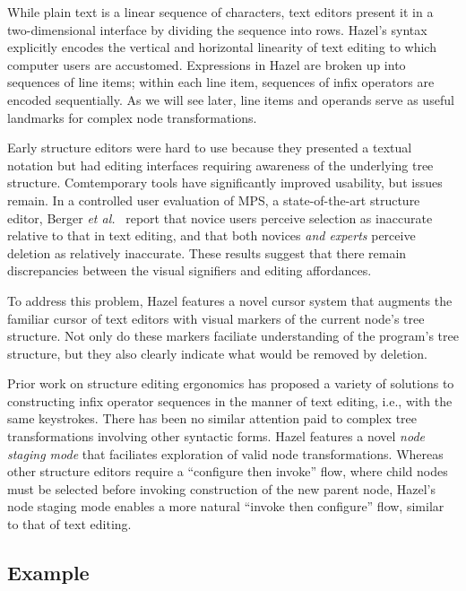 \documentclass[format=sigplan,dvipsnames,backend=bibtex]{acmart}
\newcommand{\Hazel}{\textsf{Hazel}\xspace}
\begin{document}
While plain text is a linear sequence of characters, text editors present it in a
	two-dimensional interface by dividing the sequence into rows.
\Hazel's syntax explicitly encodes the vertical and horizontal linearity of text
	editing to which computer users are accustomed.
Expressions in \Hazel are broken up into sequences of line items; 
	within each line item, sequences of infix operators are encoded sequentially.
As we will see later, line items and operands serve as useful landmarks for complex
	node transformations.

Early structure editors were hard to use because they presented a textual notation
	but had editing interfaces requiring awareness of the underlying tree structure.
Comtemporary tools have significantly improved usability, but issues remain.
In a controlled user evaluation of MPS, a state-of-the-art structure editor,
	Berger \emph{et al.}~ \cite{ProjEfficiency}
	report that novice users perceive selection as inaccurate relative to that in text
	editing, and that both novices \emph{and experts} perceive deletion as relatively inaccurate.
These results suggest that there remain discrepancies between the visual signifiers and
	editing affordances.

To address this problem, \Hazel features a novel cursor system that augments the familiar
	cursor of text editors with visual markers of the current node's tree structure.
Not only do these markers faciliate understanding of the program's tree structure,
	but they also clearly indicate what would be removed by deletion.

Prior work on structure editing ergonomics has proposed a variety of solutions to 
	constructing infix operator sequences in the manner of text editing, i.e., with the
	same keystrokes.
There has been no similar attention paid to complex tree transformations involving other 
	syntactic forms.
\Hazel features a novel \emph{node staging mode} that faciliates exploration of valid
	node transformations.
Whereas other structure editors require a ``configure then invoke'' flow, where child
	nodes must be selected before invoking construction of the new parent node, \Hazel's
	node staging mode enables a more natural ``invoke then configure'' flow, similar to
	that of text editing.

\subsection{Example}
\end{document}
